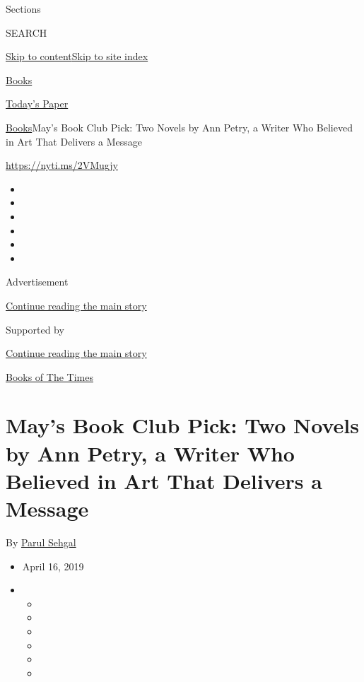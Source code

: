 Sections

SEARCH

\protect\hyperlink{site-content}{Skip to
content}\protect\hyperlink{site-index}{Skip to site index}

\href{https://www.nytimes3xbfgragh.onion/section/books}{Books}

\href{https://myaccount.nytimes3xbfgragh.onion/auth/login?response_type=cookie\&client_id=vi}{}

\href{https://www.nytimes3xbfgragh.onion/section/todayspaper}{Today's
Paper}

\href{/section/books}{Books}\textbar{}May's Book Club Pick: Two Novels
by Ann Petry, a Writer Who Believed in Art That Delivers a Message

\url{https://nyti.ms/2VMugjy}

\begin{itemize}
\item
\item
\item
\item
\item
\item
\end{itemize}

Advertisement

\protect\hyperlink{after-top}{Continue reading the main story}

Supported by

\protect\hyperlink{after-sponsor}{Continue reading the main story}

\href{/column/books-of-the-times}{Books of The Times}

\hypertarget{mays-book-club-pick-two-novels-by-ann-petry-a-writer-who-believed-in-art-that-delivers-a-message}{%
\section{May's Book Club Pick: Two Novels by Ann Petry, a Writer Who
Believed in Art That Delivers a
Message}\label{mays-book-club-pick-two-novels-by-ann-petry-a-writer-who-believed-in-art-that-delivers-a-message}}

By \href{https://www.nytimes3xbfgragh.onion/by/parul-sehgal}{Parul
Sehgal}

\begin{itemize}
\item
  April 16, 2019
\item
  \begin{itemize}
  \item
  \item
  \item
  \item
  \item
  \item
  \end{itemize}
\end{itemize}

